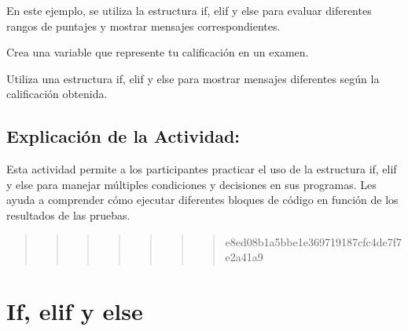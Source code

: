 \documentclass[
  a4paper,
  DIV=11,
  numbers=noendperiod,
  onepage,
  openany]{scrreprt}
\begin{document}
En este ejemplo, se utiliza la estructura if, elif y else para evaluar
diferentes rangos de puntajes y mostrar mensajes correspondientes.

\begin{tcolorbox}[enhanced jigsaw, colbacktitle=quarto-callout-important-color!10!white, toprule=.15mm, leftrule=.75mm, titlerule=0mm, opacityback=0, rightrule=.15mm, opacitybacktitle=0.6, breakable, left=2mm, coltitle=black, title=\textcolor{quarto-callout-important-color}{\faExclamation}\hspace{0.5em}{Actividad Práctica:}, toptitle=1mm, bottomtitle=1mm, arc=.35mm, bottomrule=.15mm, colback=white, colframe=quarto-callout-important-color-frame]

Crea una variable que represente tu calificación en un examen.

Utiliza una estructura if, elif y else para mostrar mensajes diferentes
según la calificación obtenida.

\end{tcolorbox}

\hypertarget{explicaciuxf3n-de-la-actividad-29}{%
\section{Explicación de la
Actividad:}\label{explicaciuxf3n-de-la-actividad-29}}

Esta actividad permite a los participantes practicar el uso de la
estructura if, elif y else para manejar múltiples condiciones y
decisiones en sus programas. Les ayuda a comprender cómo ejecutar
diferentes bloques de código en función de los resultados de las
pruebas.

\begin{quote}
\begin{quote}
\begin{quote}
\begin{quote}
\begin{quote}
\begin{quote}
\begin{quote}
e8ed08b1a5bbe1e369719187cfc4de7f7e2a41a9
\end{quote}
\end{quote}
\end{quote}
\end{quote}
\end{quote}
\end{quote}
\end{quote}

\hypertarget{if-elif-y-else}{%
\chapter{If, elif y else}\label{if-elif-y-else}}
\end{document}
